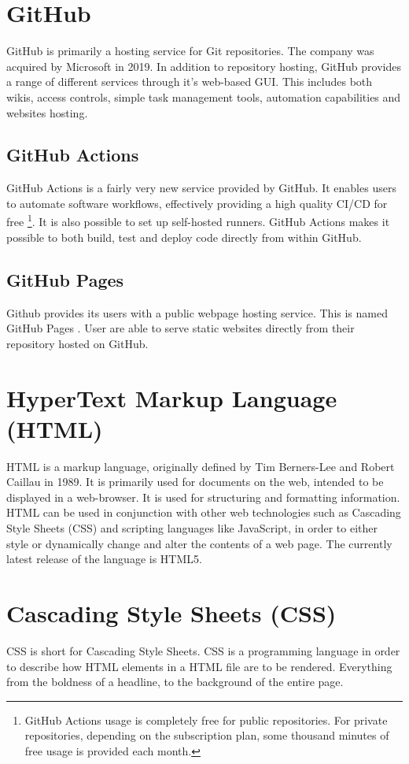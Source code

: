 \section{GitHub}
GitHub is primarily a hosting service for Git repositories. The company was acquired by Microsoft in 2019. In addition to repository hosting, GitHub provides a range of different services through it's web-based GUI. This includes both wikis, access controls, simple task management tools, automation capabilities and websites hosting.

\subsection{GitHub Actions}
GitHub Actions \cite{github-actions} is a fairly very new service provided by GitHub. It enables users to automate software workflows, effectively providing a high quality CI/CD for free \footnote{GitHub Actions usage is completely free for public repositories. For private repositories, depending on the subscription plan, some thousand minutes of free usage is provided each month.}. It is also possible to set up self-hosted runners. GitHub Actions makes it possible to both build, test and deploy code directly from within GitHub.

\subsection{GitHub Pages}
Github provides its users with a public webpage hosting service. This is named GitHub Pages \cite{github-pages}. User are able to serve static websites directly from their repository hosted on GitHub.

\section{HyperText Markup Language (HTML)}
HTML is a markup language, originally defined by Tim Berners-Lee and Robert Caillau in 1989. It is primarily used for documents on the web, intended to be displayed in a web-browser. It is used for structuring and formatting information. HTML can be used in conjunction with other web technologies such as Cascading Style Sheets (CSS) and scripting languages like JavaScript, in order to either style or dynamically change and alter the contents of a web page. The currently latest release of the language is HTML5.

\section{Cascading Style Sheets (CSS)}
CSS is short for Cascading Style Sheets. CSS is a programming language in order to describe how HTML elements in a HTML file are to be rendered. Everything from the boldness of a headline, to the background of the entire page.


